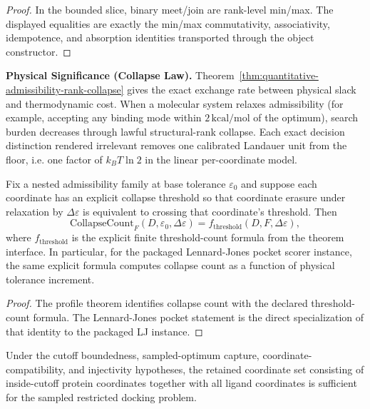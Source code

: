 \begin{proof}
In the bounded slice, binary meet/join are rank-level min/max. The displayed equalities are exactly the min/max commutativity, associativity, idempotence, and absorption identities transported through the object constructor.
\end{proof}

\textbf{Physical Significance (Collapse Law).} Theorem~\ref{thm:quantitative-admissibility-rank-collapse} gives the exact exchange rate between physical slack and thermodynamic cost. When a molecular system relaxes admissibility (for example, accepting any binding mode within $2\,\mathrm{kcal/mol}$ of the optimum), search burden decreases through lawful structural-rank collapse. Each exact decision distinction rendered irrelevant removes one calibrated Landauer unit from the floor, i.e. one factor of $k_B T\ln 2$ in the linear per-coordinate model.

\begin{theorem}\label{thm:lj-tolerance-collapse-explicit}
Fix a nested admissibility family at base tolerance $\varepsilon_0$ and suppose each coordinate has an explicit collapse threshold so that coordinate erasure under relaxation by $\Delta\varepsilon$ is equivalent to crossing that coordinate's threshold. Then
\[
\mathrm{CollapseCount}_F(D,\varepsilon_0,\Delta\varepsilon)
=
f_{\mathrm{threshold}}(D,F,\Delta\varepsilon),
\]
where $f_{\mathrm{threshold}}$ is the explicit finite threshold-count formula from the theorem interface. In particular, for the packaged Lennard-Jones pocket scorer instance, the same explicit formula computes collapse count as a function of physical tolerance increment.
\end{theorem}

\begin{proof}
The profile theorem identifies collapse count with the declared threshold-count formula. The Lennard-Jones pocket statement is the direct specialization of that identity to the packaged LJ instance.
\end{proof}

\begin{theorem}\label{thm:sampled-inside-cutoff-sufficient}
Under the cutoff boundedness, sampled-optimum capture, coordinate-compatibility, and injectivity hypotheses, the retained coordinate set consisting of inside-cutoff protein coordinates together with all ligand coordinates is sufficient for the sampled restricted docking problem.
\end{theorem}

